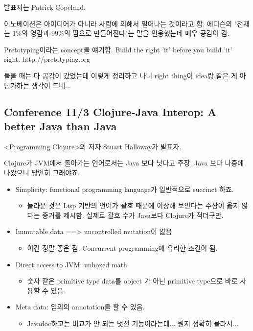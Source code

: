 \documentclass[a4paper]{article}
\begin{document}
발표자는 Patrick Copeland.
 
이노베이션은 아이디어가 아니라 사람에 의해서 일어나는 것이라고 함.
에디슨의 "천재는 1\%의 영감과 99\%의 땀으로 만들어진다"는 말을
인용했는데 매우 공감이 감.
 
Pretotyping이라는 concept을 얘기함.
Build the right 'it' before you build 'it' right.
http://pretotyping.org
 
들을 때는 다 공감이 갔었는데 이렇게 정리하고 나니 right thing이 idea랑 같은 게 아닌가하는 생각이 드네...
 
\subsection{Conference 11/3 Clojure-Java Interop: A better Java than Java}
 
<Programming Clojure>의 저자 Stuart Halloway가 발표자.
 
Clojure가 JVM에서 돌아가는 언어로서는 Java 보다 낫다고 주장. Java 보다
나중에 나왔으니 당연히 그래야죠.
 
\begin{itemize}
\item Simplicity: functional programming language가 일반적으로 succinct 하죠.
  \begin{itemize}
  \item 놀라운 것은 Lisp 기반의 언어가 괄호 때문에 이상해 보인다는
    주장이 옳지 않다는 증거를 제시함. 실제로 괄호 수가 Java보다
    Clojure가 적더구만.
  \end{itemize}

\item Immutable data ==> uncontrolled mutation이 없음
  \begin{itemize}
  \item 이건 정말 좋은 점. Concurrent programming에 유리한 조건이 됨.
  \end{itemize}

\item Direct access to JVM: unboxed math
  \begin{itemize}
  \item 숫자 같은 primitive type data를 object 가 아닌 primitive
    type으로 바로 사용할 수 있음.
  \end{itemize}

\item Meta data: 임의의 annotation을 할 수 있음.
  \begin{itemize}
  \item Javadoc하고는 비교가 안 되는 멋진 기능이라는데... 뭔지 정확히
    몰라서...
  \end{itemize}
\end{itemize}
 
\end{document}

